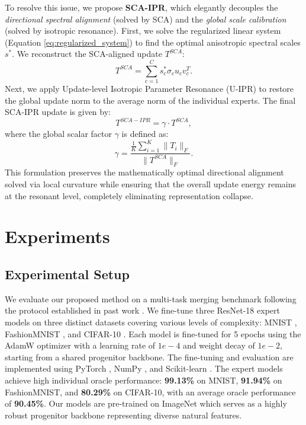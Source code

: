 \documentclass{article}
\theoremstyle{plain}
\theoremstyle{definition}
\theoremstyle{remark}
\begin{document}
To resolve this issue, we propose \textbf{SCA-IPR}, which elegantly decouples the \textit{directional spectral alignment} (solved by SCA) and the \textit{global scale calibration} (solved by isotropic resonance). 
First, we solve the regularized linear system (Equation \ref{eq:regularized_system}) to find the optimal anisotropic spectral scales $s^*$. 
We reconstruct the SCA-aligned update $T^{SCA}$:
\begin{equation}
    T^{SCA} = \sum_{c=1}^C s^*_c \sigma_c u_c v_c^T.
\end{equation}
Next, we apply Update-level Isotropic Parameter Resonance (U-IPR) \cite{sub9_ipr} to restore the global update norm to the average norm of the individual experts. 
The final SCA-IPR update is given by:
\begin{equation}
    T^{SCA-IPR} = \gamma \cdot T^{SCA},
\end{equation}
where the global scalar factor $\gamma$ is defined as:
\begin{equation}
    \gamma = \frac{\frac{1}{K} \sum_{i=1}^K \|T_i\|_F}{\|T^{SCA}\|_F}.
\end{equation}
This formulation preserves the mathematically optimal directional alignment solved via local curvature while ensuring that the overall update energy remains at the resonant level, completely eliminating representation collapse.

\section{Experiments}
\label{submission:experiments}

\subsection{Experimental Setup}
\label{subsec:setup}

We evaluate our proposed method on a multi-task merging benchmark following the protocol established in past work \cite{sub9_ipr}. 
We fine-tune three ResNet-18 expert models on three distinct datasets covering various levels of complexity: MNIST \cite{lecun1998gradient}, FashionMNIST \cite{xiao2017fashion}, and CIFAR-10 \cite{krizhevsky2009learning}. 
Each model is fine-tuned for 5 epochs using the AdamW optimizer with a learning rate of $1e-4$ and weight decay of $1e-2$, starting from a shared progenitor backbone. 
The fine-tuning and evaluation are implemented using PyTorch \cite{paszke2019pytorch}, NumPy \cite{harris2020array}, and Scikit-learn \cite{pedregosa2011scikit}.
The expert models achieve high individual oracle performance: \textbf{99.13\%} on MNIST, \textbf{91.94\%} on FashionMNIST, and \textbf{80.29\%} on CIFAR-10, with an average oracle performance of \textbf{90.45\%}.
Our models are pre-trained on ImageNet \cite{deng2009imagenet, krizhevsky2012imagenet} which serves as a highly robust progenitor backbone representing diverse natural features.
\end{document}
